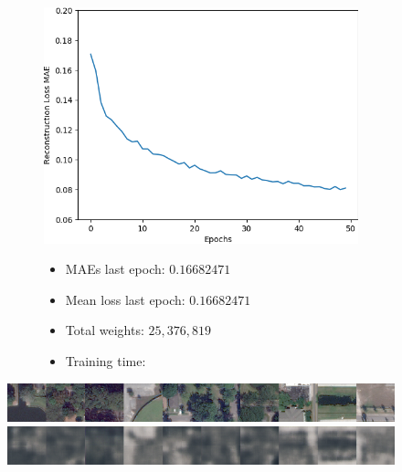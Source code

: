 \vspace{-3em}

\begin{figure}[H]
    \centering
    \begin{subfigure}{.5\textwidth}
        \centering
        \includegraphics[width=\textwidth]
        {images/figures/experiments_architecture/mae_graphKernel3adjusted2x2x256_dim1024.png}
    \end{subfigure}%
    \begin{subfigure}{.5\textwidth}
      \begin{itemize}
          \item MAEs last epoch: $0.16682471$
          \item Mean loss last epoch: $0.16682471$
          \item Total weights: $25,376,819$
          \item Training time:
      \end{itemize}
    \end{subfigure}
\end{figure}

\vspace{-2em}

\begin{figure}[H]
    \centering
    \includegraphics[width=\textwidth]
    {images/figures/experiments_architecture/inputsKernel3adjusted2x2x256_dim1024.png}
    \includegraphics[width=\textwidth]
    {images/figures/experiments_architecture/reconstructionsKernel3adjusted2x2x256_dim1024.png}
\end{figure}



